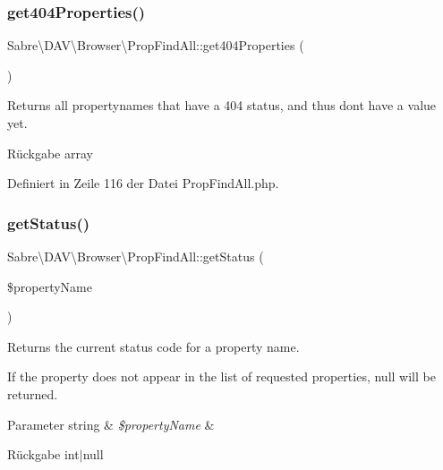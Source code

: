 \subsubsection{\texorpdfstring{get404\+Properties()}{get404Properties()}}
{\footnotesize\ttfamily Sabre\textbackslash{}\+D\+A\+V\textbackslash{}\+Browser\textbackslash{}\+Prop\+Find\+All\+::get404\+Properties (\begin{DoxyParamCaption}{ }\end{DoxyParamCaption})}

Returns all propertynames that have a 404 status, and thus don\textquotesingle{}t have a value yet.

\begin{DoxyReturn}{Rückgabe}
array 
\end{DoxyReturn}


Definiert in Zeile 116 der Datei Prop\+Find\+All.\+php.

\mbox{\label{class_sabre_1_1_d_a_v_1_1_browser_1_1_prop_find_all_acb25b90d455930d4b7dd4045a27ee895}} 
\subsubsection{\texorpdfstring{get\+Status()}{getStatus()}}
{\footnotesize\ttfamily Sabre\textbackslash{}\+D\+A\+V\textbackslash{}\+Browser\textbackslash{}\+Prop\+Find\+All\+::get\+Status (\begin{DoxyParamCaption}\item[{}]{\$property\+Name }\end{DoxyParamCaption})}

Returns the current status code for a property name.

If the property does not appear in the list of requested properties, null will be returned.


\begin{DoxyParams}[1]{Parameter}
string & {\em \$property\+Name} & \\
\hline
\end{DoxyParams}
\begin{DoxyReturn}{Rückgabe}
int$\vert$null 
\end{DoxyReturn}


